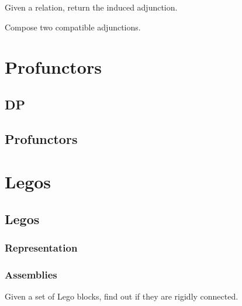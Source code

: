 \begin{exercise}
  Given a relation, return the induced adjunction.
\end{exercise}


\begin{exercise}
  Compose two compatible adjunctions.
\end{exercise}


\chapter{Profunctors}


\section{DP}\label{sec:exercises-DP}



\section{Profunctors}\label{sec:exercises-profunctors}



\chapter{Legos}
\label{ch:exercises-legos}


\section{Legos}

\subsection{Representation}

\subsection{Assemblies}

\begin{exercise}
  Given a set of Lego blocks, find out if they are rigidly connected.
\end{exercise}

